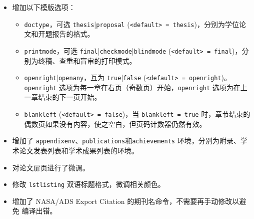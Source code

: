 \begin{itemize}
    \item 增加以下模版选项：
    \begin{itemize}
        \item \texttt{doctype}，可选 \texttt{thesis}|\texttt{proposal} (\texttt{<default> = thesis})，分别为学位论文和开题报告的格式。
        \item \texttt{printmode}，可选 \texttt{final}|\texttt{checkmode}|\texttt{blindmode} (\texttt{<default> = final})，分别为终稿、查重和盲审的打印模式。
        \item \texttt{openright}|\texttt{openany}，互为 \texttt{true}|\texttt{false} (\texttt{<default> = openright})。\texttt{openright} 选项为每一章在右页（奇数页）开始，\texttt{openright} 选项为在上一章结束的下一页开始。
        \item \texttt{blankleft} (\texttt{<default> = false})，当 \texttt{blankleft = true} 时，章节结束的偶数页如果没有内容，使之空白，但页码计数器仍然有效。
    \end{itemize}
    \item 增加了 \texttt{appendixenv}、\texttt{publications}和\texttt{achievements} 环境，分别为附录、学术论文发表列表和学术成果列表的环境。
    \item 对论文扉页进行了微调。
    \item 修改 \texttt{lstlisting} 双语标题格式，微调相关颜色。
    \item 增加了 NASA/ADS Export Citation 的期刊名命令，不需要再手动修改以避免  编译出错。
\end{itemize}

